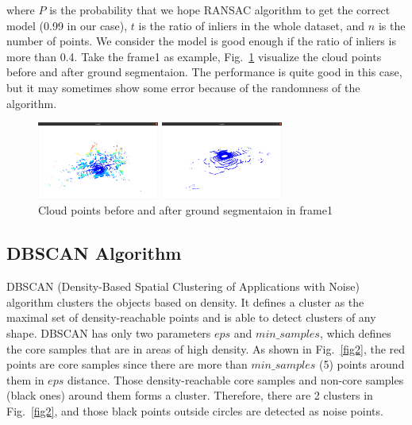 \documentclass[8pt]{article}
\theoremstyle{nonumberplain}
\begin{document}
where $P$ is the probability that we hope RANSAC algorithm to get the correct model (0.99 in our case), $t$ is the ratio of inliers in the whole dataset, and $n$ is the number of points. We consider the model is good enough if the ratio of inliers is more than 0.4. Take the frame1 as example, Fig.~\ref{fig1} visualize the cloud points before and after ground segmentaion. The performance is quite good in this case, but it may sometimes show some error because of the randomness of the algorithm.

\begin{figure}[H]
	\centering
	\begin{minipage}[t]{0.4\textwidth}
		\centering
		\includegraphics[width=4cm]{fig1a.png}
	\end{minipage}
	\begin{minipage}[t]{0.4\textwidth}
		\centering
		\includegraphics[width=4cm]{fig1b.png}
	\end{minipage}
	\caption{Cloud points before and after ground segmentaion in frame1}
	\label{fig1}
\end{figure} 



\subsection{DBSCAN Algorithm}

\hspace{1.0em}
DBSCAN (Density-Based Spatial Clustering of Applications with Noise) algorithm clusters the objects based on density. It defines a cluster as the maximal set of density-reachable points and is able to detect clusters of any shape. DBSCAN has only two parameters $eps$ and $min\_samples$, which defines the core samples that are in areas of high density. As shown in Fig.~\ref{fig2}, the red points are core samples since there are more than $min\_samples$ (5) points around them in $eps$ distance. Those density-reachable core samples and non-core samples (black ones) around them forms a cluster. Therefore, there are 2 clusters in Fig.~\ref{fig2}, and those black points outside circles are detected as noise points.
\end{document}
